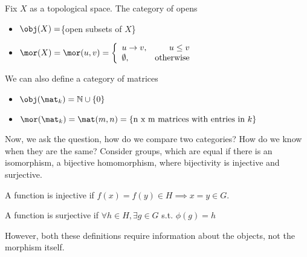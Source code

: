 \begin{definition} 
    Fix $X$ as a topological space. The category of opens
    \begin{itemize}
        \item $\obj (X) = $\{open subsets of $X$\}
        \item $\mor (X) = \mor (u,v) = \left\{ \begin{array}{lr} u \to v, & u\le v \\ \emptyset, & \text{otherwise} \end{array} \right.$
    \end{itemize}
\end{definition}

\begin{definition} 
    We can also define a category of matrices
    \begin{itemize}
        \item $\obj (\mat_k) = \mathbb{N} \cup \{0\}$
        \item $\mor (\mat_k) = \mat (m,n) = \left\{\text{n x m matrices with entries in }k \right\}$
    \end{itemize}
\end{definition}

Now, we ask the question, how do we compare two categories? How do we know when they are the same? Consider groups, which are equal if there is an isomorphism, a bijective homomorphism, where bijectivity is injective and surjective. 

\begin{definition}
    A function is injective if $f(x) = f(y) \in H \implies x = y \in G.$
\end{definition}

\begin{definition}
    A function is surjective if $\forall h\in H, \exists g \in G$ s.t. $\phi (g) = h$
\end{definition}

However, both these definitions require information about the objects, not the morphism itself. 